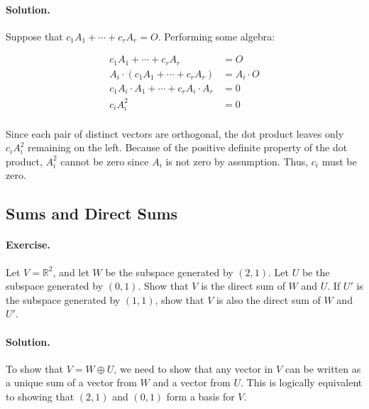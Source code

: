 \documentclass[12pt, titlepage]{article}
\newenvironment{exercise}{\paragraph{Exercise.}}{}
\newenvironment{solution}{\paragraph{Solution.}}{}
\newcommand{\R}{\mathbb{R}}
\begin{document}
\begin{solution}
  Suppose that $c_1A_1 + \cdots + c_rA_r = O$. Performing some algebra:

  \[
    \begin{aligned}
      c_1A_1 + \cdots + c_rA_r                     & = O           \\
      A_i \cdot (c_1A_1 + \cdots + c_rA_r)         & = A_i \cdot O \\
      c_1A_i \cdot A_1 + \cdots + c_rA_i \cdot A_r & = 0           \\
      c_iA_i^2                                     & = 0           \\
    \end{aligned}
  \]

  Since each pair of distinct vectors are orthogonal, the dot product leaves
  only $c_iA_i^2$ remaining on the left. Because of the positive definite
  property of the dot product, $A_i^2$ cannot be zero since $A_i$ is not zero
  by assumption. Thus, $c_i$ must be zero.
\end{solution}

\subsection{Sums and Direct Sums}

\begin{exercise}
  Let $V = \R^2$, and let $W$ be the subspace generated by $(2, 1)$. Let $U$ be
  the subspace generated by $(0, 1)$. Show that $V$ is the direct sum of $W$
  and $U$. If $U'$ is the subspace generated by $(1, 1)$, show that $V$ is also
  the direct sum of $W$ and $U'$.
\end{exercise}

\begin{solution}
  To show that $V = W \oplus U$, we need to show that any vector in $V$ can be
  written as a unique sum of a vector from $W$ and a vector from $U$. This is
  logically equivalent to showing that $(2, 1)$ and $(0, 1)$ form a basis for
  $V$.
\end{solution}
\end{document}
